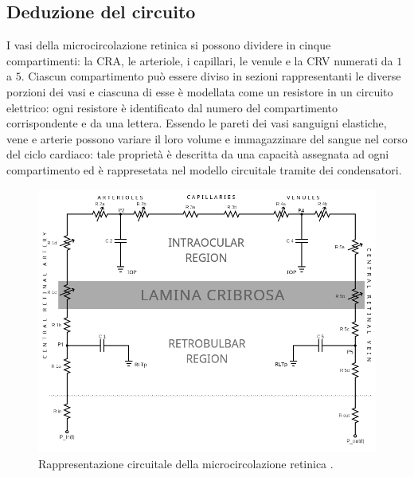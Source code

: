 \documentclass{article}
\begin{document}
\subsection{Deduzione del circuito}
I vasi della microcircolazione retinica si possono dividere in cinque compartimenti: la CRA, le arteriole, i capillari, le venule e la CRV numerati da $1$ a $5$.
Ciascun compartimento può essere diviso in sezioni rappresentanti le diverse porzioni dei vasi e ciascuna di esse è modellata come un resistore in un circuito elettrico: ogni resistore è identificato dal numero del compartimento corrispondente e da una lettera.
Essendo le pareti dei vasi sanguigni elastiche, vene e arterie possono variare il loro volume e immagazzinare del sangue nel corso del ciclo cardiaco: tale proprietà è descritta da una capacità assegnata ad ogni compartimento ed è rappresetata nel modello circuitale tramite dei condensatori.

\begin{figure}[h]
\begin{center}
\includegraphics[width=1.0\textwidth]{Pictures/circuit1.png}
\caption{Rappresentazione circuitale della microcircolazione retinica \cite{art1}.}
\label{circuito}
\end{center}
\end{figure}
\end{document}
